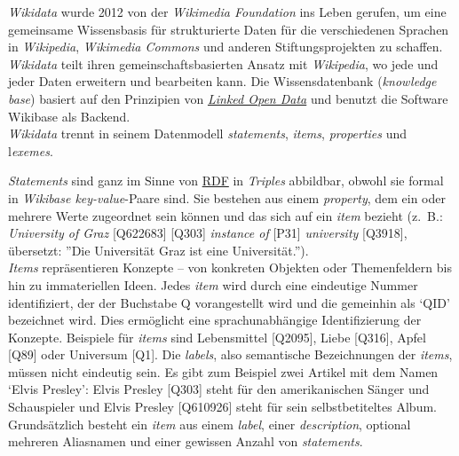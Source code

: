 \documentclass{article}
\begin{document}
    \emph{Wikidata} wurde 2012 von der \emph{Wikimedia
                     Foundation} ins Leben gerufen, um eine gemeinsame Wissensbasis für
                  strukturierte Daten für die verschiedenen Sprachen in \emph{Wikipedia}, \emph{Wikimedia Commons} und anderen
                  Stiftungsprojekten zu schaffen. \emph{Wikidata} teilt ihren
                  gemeinschaftsbasierten Ansatz mit \emph{Wikipedia}, wo jede und
                  jeder Daten erweitern und bearbeiten kann. Die Wissensdatenbank (\emph{knowledge base}) basiert auf den Prinzipien von \emph{\href{http://gams.uni-graz.at/o:konde.8}{Linked Open Data}} und benutzt die Software Wikibase
                  als Backend. \\
            
        \emph{Wikidata} trennt in seinem Datenmodell \emph{statements}, \emph{items}, \emph{properties} und l\emph{exemes}.
              
                  \emph{Statements} sind ganz im Sinne von \href{http://gams.uni-graz.at/o:konde.131}{RDF} in \emph{Triples} abbildbar,
                  obwohl sie formal in \emph{Wikibase key-value}-Paare sind. Sie
                  bestehen aus einem \emph{property}, dem ein oder mehrere Werte
                  zugeordnet sein können und das sich auf ein \emph{item} bezieht
                  (z. B.: \emph{University of Graz} [Q622683] [Q303] \emph{instance of} [P31] \emph{university} [Q3918],
                  übersetzt: ”Die Universität Graz ist eine Universität.”). \\
            
        \emph{Items} repräsentieren Konzepte – von konkreten Objekten oder
                  Themenfeldern bis hin zu immateriellen Ideen. Jedes \emph{item}
                  wird durch eine eindeutige Nummer identifiziert, der der Buchstabe Q vorangestellt
                  wird und die gemeinhin als ‘QID’ bezeichnet wird. Dies ermöglicht eine
                  sprachunabhängige Identifizierung der Konzepte. Beispiele für \emph{items} sind Lebensmittel [Q2095], Liebe [Q316], Apfel [Q89] oder Universum
                  [Q1]. Die \emph{labels}, also semantische Bezeichnungen der \emph{items}, müssen nicht eindeutig sein. Es gibt zum Beispiel
                  zwei Artikel mit dem Namen ‘Elvis Presley’: Elvis Presley [Q303] steht für den
                  amerikanischen Sänger und Schauspieler und Elvis Presley [Q610926] steht für sein
                  selbstbetiteltes Album. Grundsätzlich besteht ein \emph{item} aus
                  einem \emph{label}, einer \emph{description},
                  optional mehreren Aliasnamen und einer gewissen Anzahl von \emph{statements}.\\
            
\end{document}
